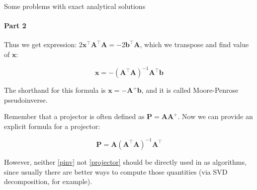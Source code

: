 \documentclass{beamer}
\begin{document}
\begin{frame}{Some problems with exact analytical solutions}
\framesubtitle{Part 2}
\begin{flushleft}

Thus we get expression: $2\mathbf{x}^\top\mathbf{A}^\top\mathbf{A} = -2\mathbf{b}^\top\mathbf{A}$, which we transpose and find value of $\mathbf{x}$:

\begin{equation} \label{pinv}
\mathbf{x} = -(\mathbf{A}^\top\mathbf{A})^{-1}\mathbf{A}^\top\mathbf{b}
\end{equation}

The shorthand for this formula is $\mathbf{x} = -\mathbf{A}^+\mathbf{b}$, and it is called Moore-Penrose pseudoinverse.

\bigskip

Remember that a projector is often defined as $\mathbf{P} = \mathbf{A}\mathbf{A}^+$. Now we can provide an explicit formula for a projector:

\begin{equation} \label{projector}
\mathbf{P} = \mathbf{A}(\mathbf{A}^\top\mathbf{A})^{-1}\mathbf{A}^\top
\end{equation}

However, neither \eqref{pinv} not \eqref{projector} should be directly used in as algorithms, since usually there are better ways to compute those quantities (via SVD decomposition, for example).

\end{flushleft}
\end{frame}
\end{document}
